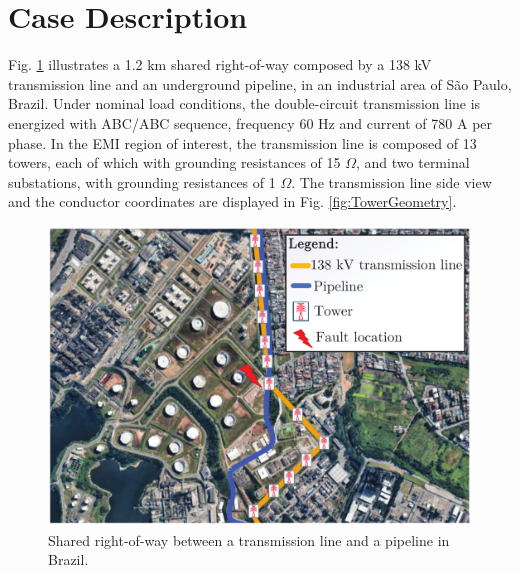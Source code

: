 \documentclass{IEEEtran4PSCC}
\begin{document}
\section{Case Description}\label{sec:ScenarioDescription}

Fig. \ref{fig:Right-of-Way} illustrates a 1.2 km shared right-of-way composed by a 138 kV transmission line and an underground pipeline, in an industrial area of São Paulo, Brazil. Under nominal load conditions, the double-circuit transmission line is energized with ABC/ABC sequence, frequency 60 Hz and current of 780 A per phase. In the EMI region of interest, the transmission line is composed of 13 towers, each of which with grounding resistances of 15 $\Omega$, and two terminal substations, with grounding resistances of 1 $\Omega$. The transmission line side view and the conductor coordinates are displayed in Fig. \ref{fig:TowerGeometry}.

\begin{figure}[hbt]
	\begin{center}
		\includegraphics[width=1\columnwidth]{./fig/right-of-way2.pdf}
		\caption{Shared right-of-way between a transmission line and a pipeline in Brazil.}
		\label{fig:Right-of-Way}
	\end{center}
\end{figure}
\end{document}
